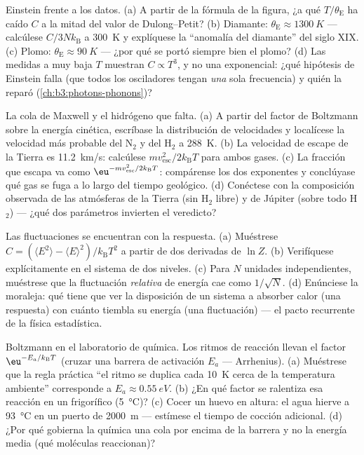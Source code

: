\begin{exercise}[$\star\star$]\label{exo:b3:canonical-ensemble:6}
Einstein frente a los datos. (a) A partir de la fórmula de la figura, ¿a qué
$T/\theta_{\text{E}}$ ha caído $C$ a la mitad del valor de Dulong--Petit? (b)
Diamante: $\theta_{\text{E}} \approx \qty{1300}{K}$ --- calcúlese
$C/3Nk_{\text{B}}$ a \qty{300}{K} y explíquese la ``anomalía del diamante''
del siglo XIX. (c) Plomo: $\theta_{\text{E}}
\approx \qty{90}{K}$ --- ¿por qué se portó siempre bien el plomo? (d)
Las medidas a muy baja $T$ muestran $C \propto T^3$, y no una
exponencial: ¿qué hipótesis de Einstein falla (que todos los
osciladores tengan \emph{una} sola frecuencia) y quién la reparó
(\cref{ch:b3:photons-phonons})?
\end{exercise}

\begin{exercise}[$\star\star$]\label{exo:b3:canonical-ensemble:7}
La cola de Maxwell y el hidrógeno que falta. (a) A partir del factor de
Boltzmann sobre la energía cinética, escríbase la distribución de velocidades
y localícese la velocidad más probable del N$_2$ y del H$_2$ a \qty{288}{K}. (b)
La velocidad de escape de la Tierra es \qty{11.2}{km/s}: calcúlese
$mv_{\text{esc}}^2/2k_{\text{B}}T$ para ambos gases. (c) La fracción que
escapa va como $\eu^{-mv_{\text{esc}}^2/2k_{\text{B}}T}$: compárense
los dos exponentes y conclúyase qué gas se fuga a lo largo del tiempo
geológico. (d) Conéctese con la composición observada de las atmósferas de
la Tierra (sin H$_2$ libre) y de Júpiter (sobre todo H$_2$) --- ¿qué dos
parámetros invierten el veredicto?
\end{exercise}

\begin{exercise}[$\star\star$]\label{exo:b3:canonical-ensemble:8}
Las fluctuaciones se encuentran con la respuesta. (a) Muéstrese $C = (\langle E^2\rangle -
\langle E\rangle^2)/k_{\text{B}}T^2$ a partir de dos derivadas de $\ln
Z$. (b) Verifíquese explícitamente en el sistema de dos niveles. (c) Para $N$
unidades independientes, muéstrese que la fluctuación \emph{relativa} de
energía cae como $1/\sqrt N$. (d) Enúnciese la moraleja: qué tiene que ver la
disposición de un sistema a absorber calor (una respuesta) con cuánto
tiembla su energía (una fluctuación) --- el pacto recurrente de la física
estadística.
\end{exercise}

\begin{exercise}[$\star\star$]\label{exo:b3:canonical-ensemble:9}
Boltzmann en el laboratorio de química. Los ritmos de reacción llevan el
factor $\eu^{-E_a/k_{\text{B}}T}$ (cruzar una barrera de activación $E_a$
--- Arrhenius). (a) Muéstrese que la regla práctica ``el ritmo se duplica
cada \qty{10}{K} cerca de la temperatura ambiente'' corresponde a $E_a \approx
\qty{0.55}{eV}$. (b) ¿En qué factor se ralentiza esa reacción en un
frigorífico (\qty{5}{\celsius})? (c) Cocer un huevo en altura: el agua
hierve a \qty{93}{\celsius} en un puerto de \qty{2000}{m} ---
estímese el tiempo de cocción adicional. (d) ¿Por qué gobierna la química una
cola por encima de la barrera y no la energía media (qué moléculas
reaccionan)?
\end{exercise}

